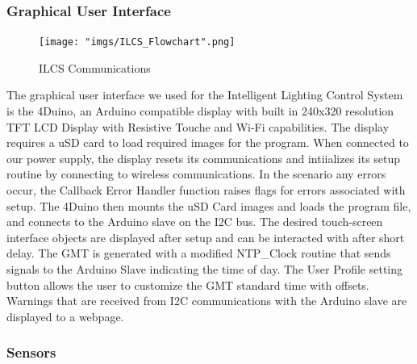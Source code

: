 \documentclass[12pt,a4paper]{report}
\begin{document}
\subsubsection{Graphical User Interface}
\begin{figure}[H]
	\centering
	\texttt{[image: "imgs/ILCS\_Flowchart".png]}\par			
	\vspace{0.1cm}
	\caption{ILCS Communications}
\end{figure} 
The graphical user interface we used for the Intelligent Lighting Control System is the 4Duino, an Arduino compatible display with built in 240x320 resolution TFT LCD Display with Resistive Touche and Wi-Fi capabilities. The display requires a uSD card to load required images for the program. When connected to our power supply, the display resets its communications and intiializes its setup routine by connecting to wireless communications. In the scenario any errors occur, the Callback Error Handler function raises flags for errors associated with setup. The 4Duino then mounts the uSD Card images and loads the program file, and connects to the Arduino slave on the I2C bus. The desired touch-screen interface objects are displayed after setup and can be interacted with after short delay. The GMT is generated with a modified NTP\_Clock routine that sends signals to the Arduino Slave indicating the time of day. The User Profile setting button allows the user to customize the GMT standard time with offsets. Warnings that are received from I2C communications with the Arduino slave are displayed to a webpage.

\subsubsection{Sensors}
\end{document}
